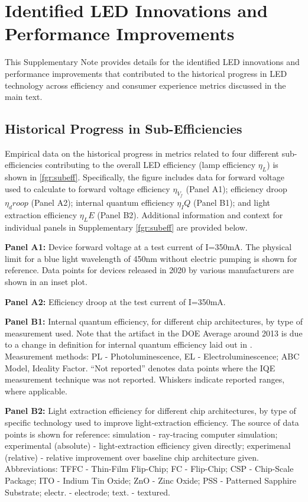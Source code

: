 \documentclass[parskip=full]{article}
\begin{document}
\clearpage
\section{Identified LED Innovations and Performance Improvements}

This Supplementary Note provides details for the identified LED innovations and performance improvements that contributed to the historical progress in LED technology across efficiency and consumer experience metrics discussed in the main text.

\subsection{Historical Progress in Sub-Efficiencies}

Empirical data on the historical progress in metrics related to four different sub-efficiencies contributing to the overall LED efficiency (lamp efficiency $\eta_L$) is shown in \cref{fgr:subeff}. Specifically, the figure includes data for forward voltage used to calculate to forward voltage efficiency $\eta_{V_f}$ (Panel A1); efficiency droop $\eta_droop$ (Panel A2); internal quantum efficiency $\eta_IQ$ (Panel B1); and light extraction efficiency $\eta_LE$ (Panel B2). Additional information and context for individual panels in Supplementary \cref{fgr:subeff} are provided below.

\textbf{Panel A1:} Device forward voltage at a test current of I=350mA. The physical limit for a blue light wavelength of 450nm without electric pumping is shown for reference. Data points for devices released in 2020 by various manufacturers are shown in an inset plot. \

\textbf{Panel A2:} Efficiency droop at the test current of I=350mA. \

\textbf{Panel B1:} Internal quantum efficiency, for different chip architectures, by type of measurement used. Note that the artifact in the DOE Average around 2013 is due to a change in definition for internal quantum efficiency laid out in \cite{doe_ssl_multiyear_2013}. Measurement methods: PL - Photoluminescence\cite{Shim_2018}, EL - Electroluminescence\cite{Getty_2009};  ABC Model\cite{Karpov_2014}, Ideality Factor\cite{Masui_2010}. “Not reported” denotes data points where the IQE measurement technique was not reported. Whiskers indicate reported ranges, where applicable. \

\textbf{Panel B2:} Light extraction efficiency for different chip architectures, by type of specific technology used to improve light-extraction efficiency. The source of data points is shown for reference: simulation - ray-tracing computer simulation; experimental (absolute) - light-extraction efficiency given directly; experimenal (relative) - relative improvement over baseline chip architecture given. Abbreviations: TFFC - Thin-Film Flip-Chip; FC - Flip-Chip; CSP - Chip-Scale Package; ITO - Indium Tin Oxide; ZnO - Zinc Oxide; PSS - Patterned Sapphire Substrate; electr. - electrode; text. - textured. 
\end{document}
